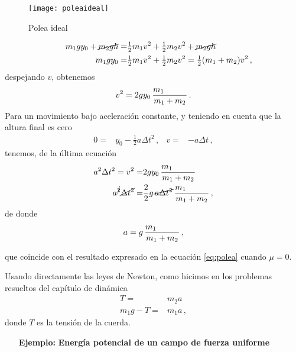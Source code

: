 \begin{frame}
  \begin{figure}
    \centering
    \texttt{[image: poleaideal]}
    \caption{Polea ideal}
    \label{fig:poleaideale}
  \end{figure}
\end{frame}

\begin{frame}
\begin{align*}
  m_1gy_0+\cancel{m_2gh}=&\tfrac{1}{2}m_1 v^2+\tfrac{1}{2}m_2 v^2+\cancel{m_2gh}\phantom{\color{red}+Q}\nonumber\\
 \phantom{\color{red}-\mu m_2 g y_0+}m_1gy_0=&\tfrac{1}{2}m_1 v^2+\tfrac{1}{2}m_2 v^2
  =\tfrac{1}{2}(m_1+m_2) v^2\,,
\end{align*}
despejando $v$, obtenemos
\begin{align*}
  v^2=2gy_0\,\frac{m_1\phantom{\color{red}-\mu m_2}}{m_1+m_2}\,.
\end{align*}
Para un movimiento bajo aceleración constante, y teniendo en cuenta que la altura final es cero
\begin{align*}
  0=&y_0-\tfrac{1}{2}a\Delta t^2\,,&
  v=&-a\Delta t\,,
\end{align*}
tenemos, de la última ecuación
\begin{align*}
  a^2 \Delta t^2=v^2
  =&2gy_0\,\frac{m_1\phantom{\color{red}-\mu m_2}}{m_1+m_2}\nonumber\\
  a^{\cancel{2}} \cancel{\Delta t^2}=&\frac{2}{2}g\,\cancel{a\Delta t^2}\,\frac{m_1\phantom{\color{red}-\mu m_2}}{m_1+m_2}\,,
\end{align*}
de donde
\begin{align}
\label{eq:acelfin}
  a=g\,\frac{m_1\phantom{\color{red}-\mu m_2}}{m_1+m_2}\,,
\end{align}
\end{frame}
que coincide con el resultado expresado en la ecuación \eqref{eq:polea} cuando $\mu=0$.


Usando directamente las leyes de Newton, como hicimos en los problemas resueltos del capítulo de dinámica
\begin{align}
  T=&m_2 a\nonumber\\
m_1g-T=&m_1 a\,,
\end{align}
donde $T$ es la tensión de la cuerda. 


\begin{inprogress}
  \begin{itemize}
  \item[\textbf{Ejemplo:}] \textbf{Energía potencial de un campo de fuerza uniforme}
  \end{itemize}
\end{inprogress}

